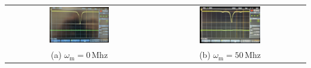 \vspace{1cm}

\begin{center}
    \captionsetup{type=figure}
    \begin{tabular}{c c}
        \includegraphics[width=0.42\textwidth]{Bilder/Modulationsindex/mindex_0.jpg} 
        & \includegraphics[width=0.42\textwidth]{Bilder/Modulationsindex/mindex_50.jpg}   \\
        (a) $\omega_\mathrm{m} = 0$\,Mhz & (b) $\omega_\mathrm{m} = 50$\,Mhz
    \end{tabular}
    \label{fig:mindex1}
\end{center}

